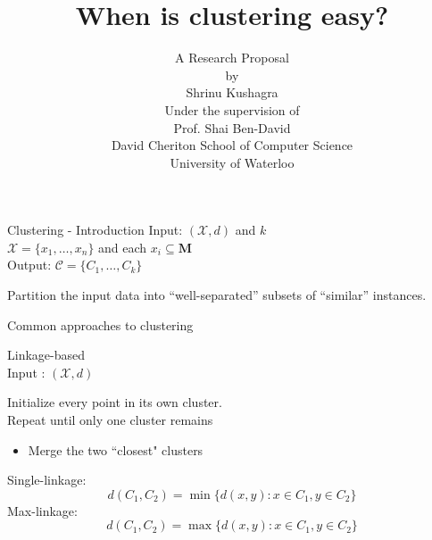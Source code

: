 \documentclass{beamer}
\title[Easy clustering]{When is clustering easy? }
\author[Kushagra, Shrinu]{
A Research Proposal\\
by\\
Shrinu Kushagra\\
\vspace{20pt}Under the supervision of\\
Prof. Shai Ben-David\vspace{20pt}\\
David Cheriton School of Computer Science\\
University of Waterloo
}
\newcommand{\mc}{\mathcal}
\newcommand{\mb}{\mathbf}
\begin{document}
\begin{frame}
  \titlepage
\end{frame}

\begin{frame}{Clustering - Introduction}
	Input: $(\mc X, d)$ and $k$\\
	$\mc X  =\{x_1, \ldots, x_n\}$ and each $ x_i \subseteq \mb M$\\   
	\vspace{1cm}Output: $\mc C = \{C_1, \ldots, C_k\}$\\
	

	\vspace{2cm}

	Partition the input data into \alert{``well-separated''} subsets of \alert{``similar''} instances.
\end{frame}

\begin{frame}{Common approaches to clustering}

	{\color{blue}Linkage-based} \\
	
	\vspace{0.5cm}Input : $(\mc X, d)$
	\vspace{0.2cm}	\begin{block}{}
		Initialize every point in its own cluster.\\
		\vspace{0.41cm}Repeat until only one cluster remains
		\begin{itemize}
			\item Merge the two ``closest" clusters
		\end{itemize}
	\end{block}
	
	\pause
	\vspace{0.5cm}Single-linkage: $$d(C_1, C_2) = \min\{d(x, y): x \in C_1, y \in C_2\}$$
	\vspace{0.5cm}Max-linkage: $$d(C_1, C_2) = \max\{d(x, y): x \in C_1, y \in C_2\}$$
	
\end{frame}
\end{document}
